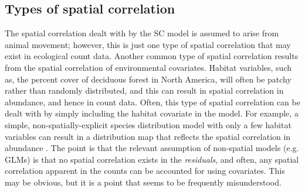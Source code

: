 \subsection{Types of spatial correlation}

The spatial correlation dealt with by the SC model is assumed to arise
from animal movement; however, this is just one type of spatial
correlation that may exist in ecological count data. Another common
type of spatial correlation results from the spatial correlation of
environmental covariates. Habitat variables, such as, %
the percent cover
of deciduous forest in North America, will often be patchy rather than randomly
distributed, and this can result in spatial correlation in abundance,
and hence in count data.  %
Often, this type of spatial correlation can be dealt with by simply including
the habitat covariate in the model. For example, a simple, non-spatially-explicit
species distribution model with only a few habitat variables can result in a
distribution map that reflects the spatial correlation in abundance
\citep{sillett_etal:2012,royle_etal:2012mee2}. %
The point is that the %
relevant assumption of non-spatial models (e.g. GLMs) is that
no spatial correlation exists in the \textit{residuals}, and often,
any spatial correlation apparent in the counts can be accounted for using
covariates. This may be obvious, but
it is a point that seems to be frequently misunderstood.

